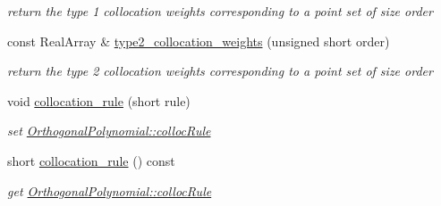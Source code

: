 \begin{DoxyCompactItemize}
\begin{DoxyCompactList}\small\item\em return the type 1 collocation weights corresponding to a point set of size order \end{DoxyCompactList}\item 
const Real\+Array \& \hyperlink{classPecos_1_1PiecewiseInterpPolynomial_a8bc6cc516ab2bccbbdca6e904dc5a10f}{type2\+\_\+collocation\+\_\+weights} (unsigned short order)
\begin{DoxyCompactList}\small\item\em return the type 2 collocation weights corresponding to a point set of size order \end{DoxyCompactList}\item 
void \hyperlink{classPecos_1_1PiecewiseInterpPolynomial_addd13d4093ce8cbf2d22c47a47aff610}{collocation\+\_\+rule} (short rule)\label{classPecos_1_1PiecewiseInterpPolynomial_addd13d4093ce8cbf2d22c47a47aff610}

\begin{DoxyCompactList}\small\item\em set \hyperlink{classPecos_1_1OrthogonalPolynomial_abcc1d84cc8e8c8b5a66f720067039f2e}{Orthogonal\+Polynomial\+::colloc\+Rule} \end{DoxyCompactList}\item 
short \hyperlink{classPecos_1_1PiecewiseInterpPolynomial_a2e390f265fcc800348dc816d6cc37f86}{collocation\+\_\+rule} () const \label{classPecos_1_1PiecewiseInterpPolynomial_a2e390f265fcc800348dc816d6cc37f86}

\begin{DoxyCompactList}\small\item\em get \hyperlink{classPecos_1_1OrthogonalPolynomial_abcc1d84cc8e8c8b5a66f720067039f2e}{Orthogonal\+Polynomial\+::colloc\+Rule} \end{DoxyCompactList}\end{DoxyCompactItemize}
